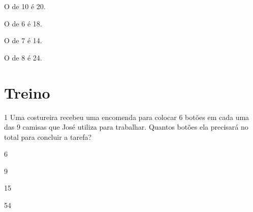 \begin{escolha}
\item
  O  de 10 é 20.
\item
  O  de 6 é 18.
\item
  O  de 7 é 14.
\item
  O  de 8 é 24.
\end{escolha}

\pagebreak

\section*{Treino}

\num{1} Uma costureira recebeu uma encomenda para colocar 6 botões em
cada uma das 9 camisas que José utiliza para trabalhar. Quantos botões
ela precisará no total para concluir a tarefa?

\begin{escolha}
    \item 6
    \item 9
    \item 15
    \item 54
\end{escolha}

